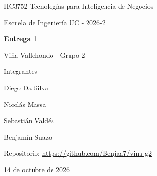 \documentclass[11pt,a4paper]{article}
\begin{document}
\begin{titlepage}
  \centering
  {\large IIC3752 Tecnologías para Inteligencia de Negocios\par}
  {\large Escuela de Ingeniería UC - 2026-2\par}
  \vspace{4cm}
  {\LARGE\bfseries Entrega 1\par}
  \vspace{0.5cm}
  {\Large Viña Vallehondo - Grupo 2\par}
  \vspace{3cm}
  {\large Integrantes\par}
  \vspace{0.3cm}
  Diego Da Silva\par
  Nicolás Massa\par
  Sebastián Valdés\par
  Benjamín Suazo\par
  \vfill
  Repositorio: \url{https://github.com/Benjaa7/vina-g2}\par
  \vspace{0.5cm}
  14 de octubre de 2026
\end{titlepage}








\clearpage
\appendix

\clearpage

\clearpage

\clearpage

\clearpage

\clearpage

\end{document}
